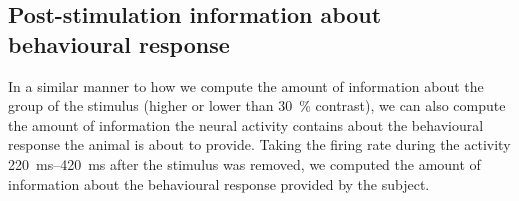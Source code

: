 \subsection{Post-stimulation information about behavioural response}

In a similar manner to how we compute the amount of information about the group of the stimulus (higher or lower than \SI{30}{\percent} contrast), we can also compute the amount of information the neural activity contains about the behavioural response the animal is about to provide.
Taking the firing rate during the activity \SIrange{220}{420}{\milli\second} after the stimulus was removed, we computed the amount of information about the behavioural response provided by the subject.

%
%
